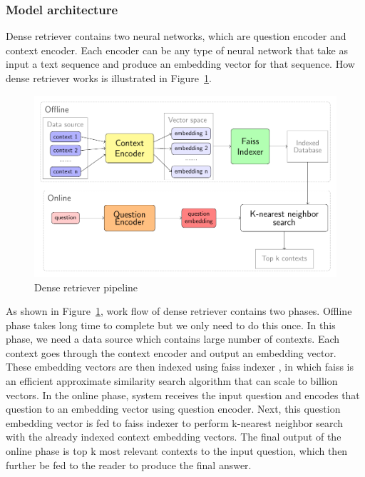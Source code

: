 \documentclass[3p, sort&compress, 12pt]{elsarticle}
\begin{document}
\subsubsection{Model architecture}
Dense retriever contains two neural networks, which are question encoder and context encoder. Each encoder can be any type of neural network that take as input a text sequence and produce an embedding vector for that sequence. How dense retriever works is illustrated in Figure~\ref{fig:04}.
\begin{figure}[!htbp]
	\centering
	\includegraphics[scale=.8]{images/PDF/biencoder/biencoder.pdf}
	\caption{Dense retriever pipeline}
	\label{fig:04}
\end{figure}
\par As shown in Figure~\ref{fig:04}, work flow of dense retriever contains two phases. Offline phase takes long time to complete but we only need to do this once. In this phase, we need a data source which contains large number of contexts. Each context goes through the context encoder and output an embedding vector. These embedding vectors are then indexed using faiss indexer \cite{JDH17}, in which faiss is an efficient approximate similarity search algorithm that can scale to billion vectors. In the online phase, system receives the input question and encodes that question to an embedding vector using question encoder. Next, this question embedding vector is fed to faiss indexer to perform k-nearest neighbor search with the already indexed context embedding vectors. The final output of the online phase is top k most relevant contexts to the input question, which then further be fed to the reader to produce the final answer.
\end{document}
